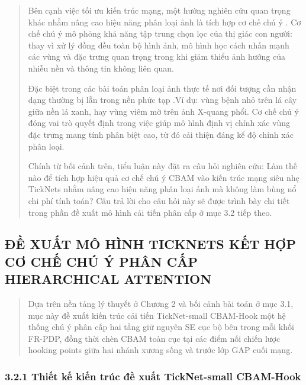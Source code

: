\documentclass[
]{article}
\begin{document}
\begin{quote}
Bên cạnh việc tối ưu kiến trúc mạng, một hướng nghiên cứu quan trọng
khác nhằm nâng cao hiệu năng phân loại ảnh là tích hợp cơ chế chú ý . Cơ
chế chú ý mô phỏng khả năng tập trung chọn lọc của thị giác con người:
thay vì xử lý đồng đều toàn bộ hình ảnh, mô hình học cách nhấn mạnh các
vùng và đặc trưng quan trọng trong khi giảm thiểu ảnh hưởng của nhiễu
nền và thông tin không liên quan.

Đặc biệt trong các bài toán phân loại ảnh thực tế nơi đối tượng cần nhận
dạng thường bị lẫn trong nền phức tạp .Ví dụ: vùng bệnh nhỏ trên lá cây
giữa nền lá xanh, hay vùng viêm mờ trên ảnh X-quang phổi. Cơ chế chú ý
đóng vai trò quyết định trong việc giúp mô hình định vị chính xác vùng
đặc trưng mang tính phân biệt cao, từ đó cải thiện đáng kể độ chính xác
phân loại.

Chính từ bối cảnh trên, tiểu luận này đặt ra câu hỏi nghiên cứu: Làm thế
nào để tích hợp hiệu quả cơ chế chú ý CBAM vào kiến trúc mạng siêu nhẹ
TickNets nhằm nâng cao hiệu năng phân loại ảnh mà không làm bùng nổ chi
phí tính toán? Câu trả lời cho câu hỏi này sẽ được trình bày chi tiết
trong phần đề xuất mô hình cải tiến phân cấp ở mục 3.2 tiếp theo.
\end{quote}

\hypertarget{ux111ux1ec1-xuux1ea5t-muxf4-huxecnh-ticknets-kux1ebft-hux1ee3p-cux1a1-chux1ebf-chuxfa-uxfd-phuxe2n-cux1ea5p-hierarchical-attention}{%
\subsection{ĐỀ XUẤT MÔ HÌNH TICKNETS KẾT HỢP CƠ CHẾ CHÚ Ý PHÂN CẤP
HIERARCHICAL
ATTENTION}\label{ux111ux1ec1-xuux1ea5t-muxf4-huxecnh-ticknets-kux1ebft-hux1ee3p-cux1a1-chux1ebf-chuxfa-uxfd-phuxe2n-cux1ea5p-hierarchical-attention}}

\begin{quote}
Dựa trên nền tảng lý thuyết ở Chương 2 và bối cảnh bài toán ở mục 3.1,
mục này đề xuất kiến trúc cải tiến TickNet-small CBAM-Hook một hệ thống
chú ý phân cấp hai tầng giữ nguyên SE cục bộ bên trong mỗi khối FR-PDP,
đồng thời chèn CBAM toàn cục tại các điểm nối chiến lược hooking points
giữa hai nhánh xương sống và trước lớp GAP cuối mạng.
\end{quote}

\hypertarget{thiux1ebft-kux1ebf-kiux1ebfn-truxfac-ux111ux1ec1-xuux1ea5t-ticknet-small-cbam-hook}{%
\subsubsection{3.2.1 Thiết kế kiến trúc đề xuất TickNet-small
CBAM-Hook}\label{thiux1ebft-kux1ebf-kiux1ebfn-truxfac-ux111ux1ec1-xuux1ea5t-ticknet-small-cbam-hook}}
\end{document}
